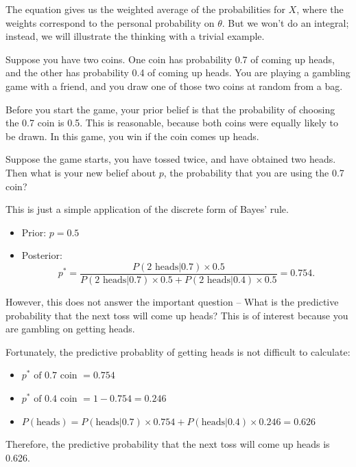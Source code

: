 \documentclass[]{book}
\providecommand{\tightlist}{%
  \setlength{\itemsep}{0pt}\setlength{\parskip}{0pt}}
\theoremstyle{definition}
\theoremstyle{definition}
\theoremstyle{definition}
\theoremstyle{remark}
\let\BeginKnitrBlock\begin \let\EndKnitrBlock\end
\begin{document}
The equation gives us the weighted average of the probabilities for
\(X\), where the weights correspond to the personal probability on
\(\theta\). But we won't do an integral; instead, we will illustrate the
thinking with a trivial example.

\BeginKnitrBlock{example}
\protect\hypertarget{exm:unnamed-chunk-1}{}\label{exm:unnamed-chunk-1}
Suppose you have two coins. One coin has probability 0.7 of coming up
heads, and the other has probability 0.4 of coming up heads. You are
playing a gambling game with a friend, and you draw one of those two
coins at random from a bag.

Before you start the game, your prior belief is that the probability of
choosing the 0.7 coin is 0.5. This is reasonable, because both coins
were equally likely to be drawn. In this game, you win if the coin comes
up heads.

Suppose the game starts, you have tossed twice, and have obtained two
heads. Then what is your new belief about \(p\), the probability that
you are using the 0.7 coin?
\EndKnitrBlock{example}

This is just a simple application of the discrete form of Bayes' rule.

\begin{itemize}
\tightlist
\item
  Prior: \(p=0.5\)
\item
  Posterior:
  \[p^* = \frac{P(\text{2 heads}|0.7) \times 0.5}{P(\text{2 heads}|0.7) \times 0.5 + P(\text{2 heads}|0.4) \times 0.5} = 0.754.\]
\end{itemize}

However, this does not answer the important question -- What is the
predictive probability that the next toss will come up heads? This is of
interest because you are gambling on getting heads.

Fortunately, the predictive probablity of getting heads is not difficult
to calculate:

\begin{itemize}
\tightlist
\item
  \(p^* \text{ of 0.7 coin } = 0.754\)
\item
  \(p^* \text{ of 0.4 coin } = 1 − 0.754 = 0.246\)
\item
  \(P(\text{heads}) = P(\text{heads} | 0.7) \times 0.754 + P(\text{heads} | 0.4) \times 0.246 = 0.626\)
\end{itemize}

Therefore, the predictive probability that the next toss will come up
heads is 0.626.
\end{document}
